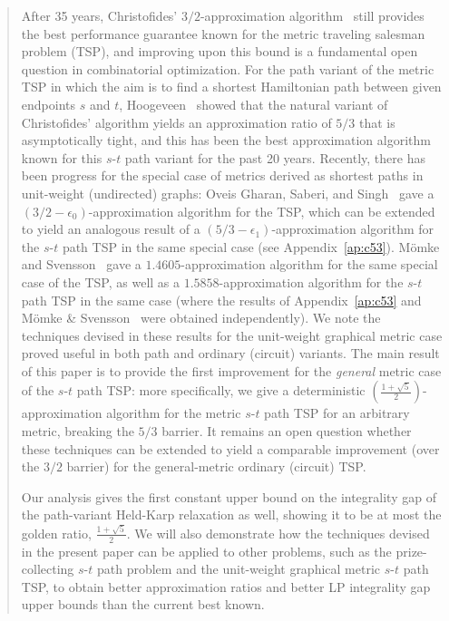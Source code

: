 \documentclass[11pt,letterpaper]{article}
\newcommand{\st}{\mbox{$s$-$t$} }
\begin{document}
\begin{quote}
After 35 years, Christofides' $3/2$-approximation algorithm~\cite{C} still provides the best performance guarantee known for the metric traveling salesman problem (TSP), and improving upon this bound is a fundamental open question in combinatorial optimization. For the path variant of the metric TSP in which the aim is to find a shortest Hamiltonian path between given endpoints $s$ and $t$, Hoogeveen~\cite{H} showed that the natural variant of Christofides' algorithm yields an approximation ratio of $5/3$ that is asymptotically tight, and this has been the best approximation algorithm known for this \st path variant for the past 20 years. Recently, there has been progress for the special case of metrics derived as shortest paths in unit-weight (undirected) graphs: Oveis Gharan, Saberi, and Singh~\cite{OSS} gave a $(3/2-\epsilon_0)$-approximation algorithm for the TSP, which can be extended to yield an analogous result of a $(5/3-\epsilon_1)$-approximation algorithm for the \st path TSP in the same special case (see Appendix~\ref{ap:c53}). M\"omke and Svensson~\cite{MS} gave a $1.4605$-approximation algorithm for the same special case of the TSP, as well as a $1.5858$-approximation algorithm for the \st path TSP in the same case (where the results of Appendix~\ref{ap:c53} and M\"omke \& Svensson~\cite{MS} were obtained independently). We note the techniques devised in these results for the unit-weight graphical metric case proved useful in both path and ordinary (circuit) variants. The main result of this paper is to provide the first improvement for the \emph{general} metric case of the \st path TSP: more specifically, we give a deterministic $\left(\frac{1+\sqrt{5}}{2}\right)$-approximation algorithm for the metric \st path TSP for an arbitrary metric, breaking the $5/3$ barrier. It remains an open question whether these techniques can be extended to yield a comparable improvement (over the $3/2$ barrier) for the general-metric ordinary (circuit) TSP.

Our analysis gives the first constant upper bound on the integrality gap of the path-variant Held-Karp relaxation as well, showing it to be at most the golden ratio, $\frac{1+\sqrt{5}}{2}$. We will also demonstrate how the techniques devised in the present paper can be applied to other problems, such as the prize-collecting \st path problem and the unit-weight graphical metric \st path TSP, to obtain better approximation ratios and better LP integrality gap upper bounds than the current best known.


\end{quote}
\end{document}

